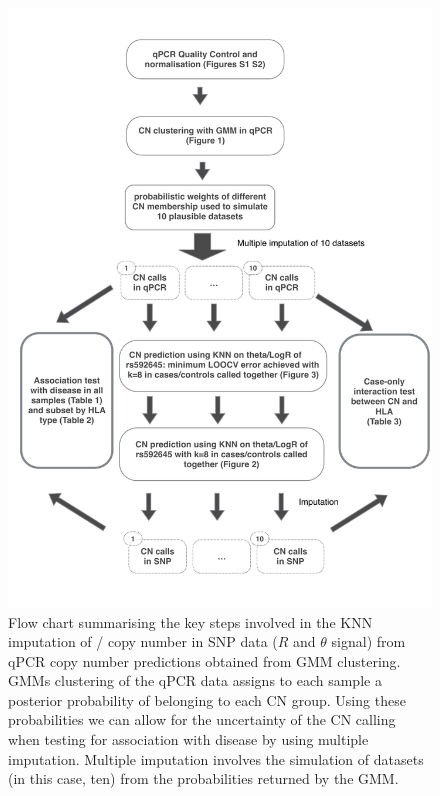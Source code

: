 \begin{figure}[h]
    \centering
        \includegraphics[scale=.5] {KIR/figures/method-flowchart.pdf}
{Flow chart summarising the key steps involved in the KNN imputation of / copy number in SNP data
($R$ and $\theta$ signal) from qPCR copy number predictions obtained from GMM clustering.}
{
\Glspl{GMM} clustering of the qPCR data assigns to each sample a posterior probability of belonging to each \gls{CN} group.
Using these probabilities we can allow for the uncertainty of the CN calling when testing for association with disease by using multiple imputation.
Multiple imputation involves the simulation of datasets (in this case, ten) from the probabilities returned by the GMM.
}
\end{figure}
